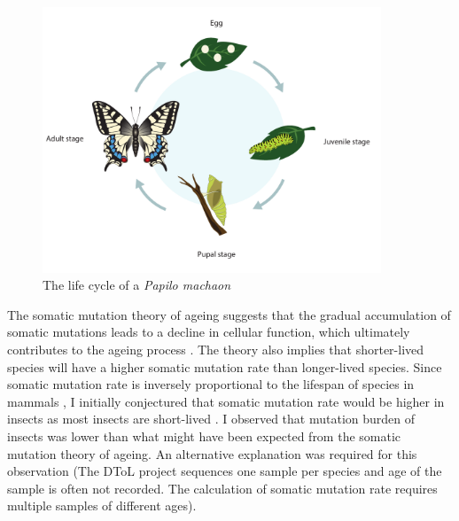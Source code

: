 \begin{figure}[h!]
\caption{The life cycle of a \textit{Papilo machaon}}
\label{figure:papilo-machaon}
\begin{centering}
\includegraphics[width=0.9\textwidth]{papilo_machaon_life_cycle.pdf} 
\end{centering}
\end{figure}

The somatic mutation theory of ageing suggests that the gradual accumulation of somatic mutations leads to a decline in cellular function, which ultimately contributes to the ageing process \cite{Szilard1959-ru}. The theory also implies that shorter-lived species will have a higher somatic mutation rate than longer-lived species. Since somatic mutation rate is inversely proportional to the lifespan of species in mammals \cite{Cagan2022-yn}, I initially conjectured that somatic mutation rate would be higher in insects as most insects are short-lived \cite{Promislow2022-en}. I observed that mutation burden of insects was lower than what might have been expected from the somatic mutation theory of ageing. An alternative explanation was required for this observation (The DToL project sequences one sample per species and age of the sample is often not recorded. The calculation of somatic mutation rate requires multiple samples of different ages). 

